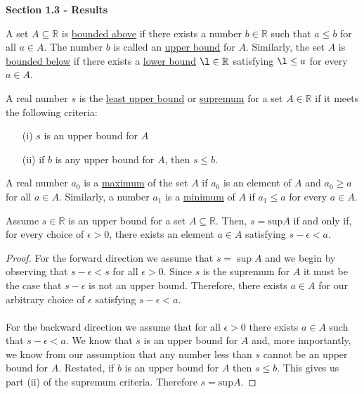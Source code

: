 \documentclass[11pt]{article}
\newcommand{\mytitlecompact}[1]{{

\hfill
{\Large \sffamily \bfseries{#1}}
\hfill
}}
\def\R{{\mathbb{R}}}
\newenvironment{defn}[1]
    {\renewcommand\theinnercustomdefn{#1}\innercustomdefn\upshape}
    {\endinnercustomdefn}
\newenvironment{lemma}[1]
    {\renewcommand\theinnercustomlemma{#1}\innercustomlemma}
    {\endinnercustomlemma}
\begin{document}
\mytitlecompact{Section 1.3 - Results}

\begin{defn}{1.3.1}
    A set $A\subseteq\R$ is \underline{bounded above} if there exists a number $b\in\R$ such that $a\leq b$ for all $a\in A$. The number $b$ is called an \underline{upper bound} for $A$. Similarly, the set $A$ is \underline{bounded below} if there exists a \underline{lower bound} $\l\in\R$ satisfying $\l\leq a$ for every $a\in A$.
\end{defn}

\begin{defn}{1.3.2}
    A real number $s$ is the \underline{least upper bound} or \underline{supremum} for a set $A\in\R$ if it meets the following criteria:
    \begin{enumerate}
        \item[(i)]
            $s$ is an upper bound for $A$
        \item[(ii)]
            if $b$ is any upper bound for $A$, then $s\leq b$.
    \end{enumerate}
\end{defn}

\begin{defn}{1.3.4}
    A real number $a_0$ is a \underline{maximum} of the set $A$ if $a_0$ is an element of $A$ and $a_0\geq a$ for all $a\in A$. Similarly, a number $a_1$ is a \underline{minimum} of $A$ if $a_1\leq a$ for every $a\in A$.
\end{defn}

\begin{lemma}{1.3.8}
    Assume $s\in\R$ is an upper bound for a set $A\subseteq\R$. Then, $s=\mathrm{sup}A$ if and only if, for every choice of $\epsilon>0$, there exists an element $a\in A$ satisfying $s-\epsilon<a$.
\end{lemma}
\begin{proof}
    For the forward direction we assume that $s=\sup A$ and we begin by observing that $s-\epsilon<s$ for all $\epsilon>0$. Since $s$ is the supremum for $A$ it must be the case that $s-\epsilon$ is not an upper bound. Therefore, there exists $a\in A$ for our arbitrary choice of $\epsilon$ satisfying $s-\epsilon<a$. \\ \\
    For the backward direction we assume that for all $\epsilon>0$ there exists $a\in A$ such that $s-\epsilon<a$. We know that $s$ is an upper bound for $A$ and, more importantly, we know from our assumption that any number less than $s$ cannot be an upper bound for $A$. Restated, if $b$ is an upper bound for $A$ then $s\leq b$. This gives us part (ii) of the supremum criteria. Therefore $s=\mathrm{sup}A$.
\end{proof}
\end{document}
